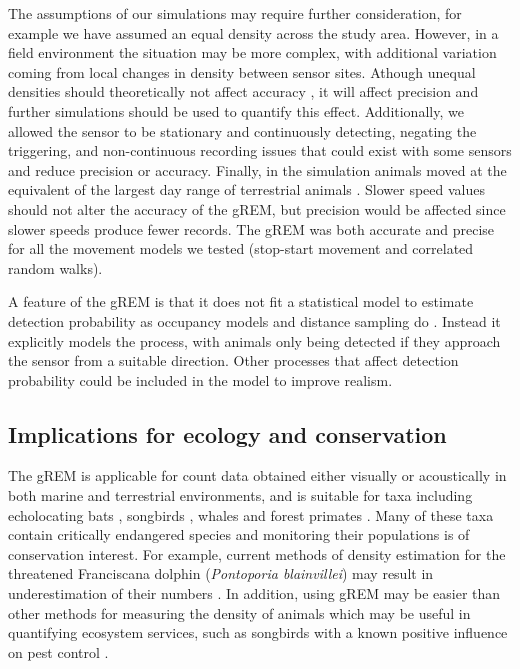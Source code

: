 The assumptions of our simulations may require further consideration, for example we have assumed an equal density across the study area.
However, in a field environment the situation may be more complex, with additional variation coming from local changes in density between sensor sites.
Athough unequal densities should theoretically not affect accuracy \cite{Hutchinson_Waser_2007}, it will affect precision and further simulations should be used to quantify this effect.
Additionally, we allowed the sensor to be stationary and continuously detecting, negating the triggering, and non-continuous recording issues that could exist with some sensors and reduce precision or accuracy.
Finally, in the simulation animals moved at the equivalent of the largest day range of terrestrial animals \cite{carbone2005far}.
Slower speed values should not alter the accuracy of the gREM, but precision would be affected since slower speeds produce fewer records.
The gREM was both accurate and precise for all the movement models we tested (stop-start movement and correlated random walks).

A feature of the gREM is that it does not fit a statistical model to estimate detection probability as occupancy models and distance sampling do \cite{royle2003estimating, barlow2005estimates, marques2011estimating}.
Instead it explicitly models the process, with animals only being detected if they approach the sensor from a suitable direction.
Other processes that affect detection probability could be included in the model to improve realism.

\subsection{Implications for ecology and conservation}

The gREM is applicable for count data obtained either visually or acoustically in both marine and terrestrial environments, and is suitable for taxa including echolocating bats \cite{walters2012continental}, songbirds \cite{buckland2006point}, whales \cite{marques2011estimating} and forest primates \cite{hassel2008reliable}.
Many of these taxa contain critically endangered species and monitoring their populations is of conservation interest.
For example, current methods of density estimation for the threatened Franciscana dolphin (\emph{Pontoporia blainvillei}) may result in underestimation of their numbers \cite{crespo2010abundance}.
In addition, using gREM may be easier than other methods for measuring the density of animals which may be useful in quantifying ecosystem services, such as songbirds with a known positive influence on pest control \cite{jirinec2011roosting}.

